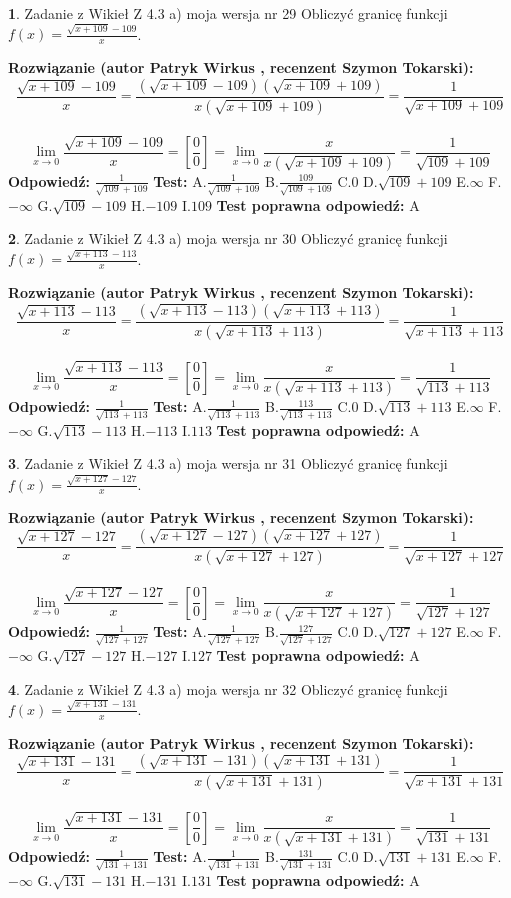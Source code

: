 \documentclass[12pt, a4paper]{article}
\theoremstyle{definition} %
\newtheorem{zad}{}
\newcommand{\zadStart}[1]{\begin{zad}#1\newline}
\newcommand{\zadStop}{\end{zad}}
\newcommand{\rozwStart}[2]{\noindent \textbf{Rozwiązanie (autor #1 , recenzent #2): }\newline}
\newcommand{\rozwStop}{\newline}
\newcommand{\odpStart}{\noindent \textbf{Odpowiedź:}\newline}
\newcommand{\odpStop}{\newline}
\newcommand{\testStart}{\noindent \textbf{Test:}\newline}
\newcommand{\testStop}{\newline}
\newcommand{\kluczStart}{\noindent \textbf{Test poprawna odpowiedź:}\newline}
\newcommand{\kluczStop}{\newline}
\begin{document}
\zadStart{Zadanie z Wikieł Z 4.3 a) moja wersja nr 29}
Obliczyć granicę funkcji $f(x)=\frac{\sqrt{x+109}-109}{x}$.
\zadStop
\rozwStart{Patryk Wirkus}{Szymon Tokarski}
$$\frac{\sqrt{x+109}-109}{x}=\frac{(\sqrt{x+109}-109)(\sqrt{x+109}+109)}{x(\sqrt{x+109}+109)}=\frac{1}{\sqrt{x+109}+109}$$
\\
$$\lim\limits_{x\to0}\frac{\sqrt{x+109}-109}{x}=[\frac{0}{0}]=
\lim\limits_{x\to0}\frac{x}{x(\sqrt{x+109}+109)} = \frac{1}{\sqrt{109}+109}$$
\rozwStop
\odpStart
$\frac{1}{\sqrt{109}+109}$
\odpStop
\testStart
A.$\frac{1}{\sqrt{109}+109}$
B.$\frac{109}{\sqrt{109}+109}$
C.$0$
D.$\sqrt{109}+109$
E.$\infty$
F.$-\infty$
G.$\sqrt{109}-109$
H.$-109$
I.$109$
\testStop
\kluczStart
A
\kluczStop



\zadStart{Zadanie z Wikieł Z 4.3 a) moja wersja nr 30}
Obliczyć granicę funkcji $f(x)=\frac{\sqrt{x+113}-113}{x}$.
\zadStop
\rozwStart{Patryk Wirkus}{Szymon Tokarski}
$$\frac{\sqrt{x+113}-113}{x}=\frac{(\sqrt{x+113}-113)(\sqrt{x+113}+113)}{x(\sqrt{x+113}+113)}=\frac{1}{\sqrt{x+113}+113}$$
\\
$$\lim\limits_{x\to0}\frac{\sqrt{x+113}-113}{x}=[\frac{0}{0}]=
\lim\limits_{x\to0}\frac{x}{x(\sqrt{x+113}+113)} = \frac{1}{\sqrt{113}+113}$$
\rozwStop
\odpStart
$\frac{1}{\sqrt{113}+113}$
\odpStop
\testStart
A.$\frac{1}{\sqrt{113}+113}$
B.$\frac{113}{\sqrt{113}+113}$
C.$0$
D.$\sqrt{113}+113$
E.$\infty$
F.$-\infty$
G.$\sqrt{113}-113$
H.$-113$
I.$113$
\testStop
\kluczStart
A
\kluczStop



\zadStart{Zadanie z Wikieł Z 4.3 a) moja wersja nr 31}
Obliczyć granicę funkcji $f(x)=\frac{\sqrt{x+127}-127}{x}$.
\zadStop
\rozwStart{Patryk Wirkus}{Szymon Tokarski}
$$\frac{\sqrt{x+127}-127}{x}=\frac{(\sqrt{x+127}-127)(\sqrt{x+127}+127)}{x(\sqrt{x+127}+127)}=\frac{1}{\sqrt{x+127}+127}$$
\\
$$\lim\limits_{x\to0}\frac{\sqrt{x+127}-127}{x}=[\frac{0}{0}]=
\lim\limits_{x\to0}\frac{x}{x(\sqrt{x+127}+127)} = \frac{1}{\sqrt{127}+127}$$
\rozwStop
\odpStart
$\frac{1}{\sqrt{127}+127}$
\odpStop
\testStart
A.$\frac{1}{\sqrt{127}+127}$
B.$\frac{127}{\sqrt{127}+127}$
C.$0$
D.$\sqrt{127}+127$
E.$\infty$
F.$-\infty$
G.$\sqrt{127}-127$
H.$-127$
I.$127$
\testStop
\kluczStart
A
\kluczStop



\zadStart{Zadanie z Wikieł Z 4.3 a) moja wersja nr 32}
Obliczyć granicę funkcji $f(x)=\frac{\sqrt{x+131}-131}{x}$.
\zadStop
\rozwStart{Patryk Wirkus}{Szymon Tokarski}
$$\frac{\sqrt{x+131}-131}{x}=\frac{(\sqrt{x+131}-131)(\sqrt{x+131}+131)}{x(\sqrt{x+131}+131)}=\frac{1}{\sqrt{x+131}+131}$$
\\
$$\lim\limits_{x\to0}\frac{\sqrt{x+131}-131}{x}=[\frac{0}{0}]=
\lim\limits_{x\to0}\frac{x}{x(\sqrt{x+131}+131)} = \frac{1}{\sqrt{131}+131}$$
\rozwStop
\odpStart
$\frac{1}{\sqrt{131}+131}$
\odpStop
\testStart
A.$\frac{1}{\sqrt{131}+131}$
B.$\frac{131}{\sqrt{131}+131}$
C.$0$
D.$\sqrt{131}+131$
E.$\infty$
F.$-\infty$
G.$\sqrt{131}-131$
H.$-131$
I.$131$
\testStop
\kluczStart
A
\kluczStop
\end{document}
